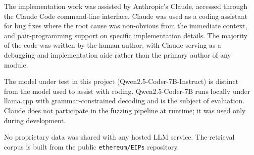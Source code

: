 \documentclass[conference]{IEEEtran}
\begin{document}
The implementation work was assisted by Anthropic's Claude, accessed through the Claude Code command-line interface. Claude was used as a coding assistant for bug fixes where the root cause was non-obvious from the immediate context, and pair-programming support on specific implementation details. The majority of the code was written by the human author, with Claude serving as a debugging and implementation aide rather than the primary author of any module.

The model under test in this project (Qwen2.5-Coder-7B-Instruct) is distinct from the model used to assist with coding. Qwen2.5-Coder-7B runs locally under llama.cpp with grammar-constrained decoding and is the subject of evaluation. Claude does not participate in the fuzzing pipeline at runtime; it was used only during development.

No proprietary data was shared with any hosted LLM service. The retrieval corpus is built from the public \texttt{ethereum/EIPs} repository.
\end{document}
